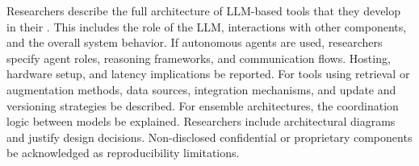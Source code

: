 Researchers \must describe the full architecture of LLM-based tools that they develop in their \paper. This includes the role of the LLM, interactions with other components, and the overall system behavior. If autonomous agents are used, researchers \must specify agent roles, reasoning frameworks, and communication flows. Hosting, hardware setup, and latency implications \must be reported. For tools using retrieval or augmentation methods, data sources, integration mechanisms, and update and versioning strategies \must be described. For ensemble architectures, the coordination logic between models \must be explained. Researchers \should include architectural diagrams and justify design decisions. Non-disclosed confidential or proprietary components \must be acknowledged as reproducibility limitations.